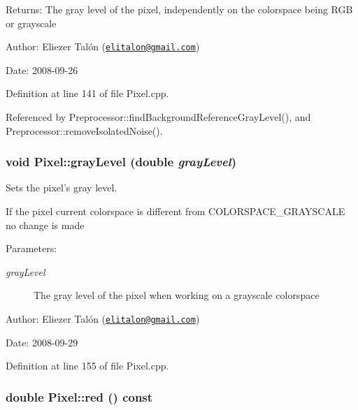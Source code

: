 \begin{Desc}
\item[Returns:]The gray level of the pixel, independently on the colorspace being RGB or grayscale\end{Desc}
\begin{Desc}
\item[Author:]Eliezer Talón (\href{mailto:elitalon@gmail.com}{\tt elitalon@gmail.com}) \end{Desc}
\begin{Desc}
\item[Date:]2008-09-26 \end{Desc}


Definition at line 141 of file Pixel.cpp.

Referenced by Preprocessor::findBackgroundReferenceGrayLevel(), and Preprocessor::removeIsolatedNoise().\hypertarget{class_pixel_03f96954bfc27f8f8810e8c6e58828f8}{
\subsubsection[grayLevel]{\setlength{\rightskip}{0pt plus 5cm}void Pixel::grayLevel (double {\em grayLevel})}}
\label{class_pixel_03f96954bfc27f8f8810e8c6e58828f8}


Sets the pixel's gray level. 

If the pixel current colorspace is different from COLORSPACE\_\-GRAYSCALE no change is made

\begin{Desc}
\item[Parameters:]
\begin{description}
\item[{\em grayLevel}]The gray level of the pixel when working on a grayscale colorspace\end{description}
\end{Desc}
\begin{Desc}
\item[Author:]Eliezer Talón (\href{mailto:elitalon@gmail.com}{\tt elitalon@gmail.com}) \end{Desc}
\begin{Desc}
\item[Date:]2008-09-29 \end{Desc}


Definition at line 155 of file Pixel.cpp.\hypertarget{class_pixel_52542702e90cafc9c29713c23cd35e8f}{
\subsubsection[red]{\setlength{\rightskip}{0pt plus 5cm}double Pixel::red () const}}
\label{class_pixel_52542702e90cafc9c29713c23cd35e8f}


